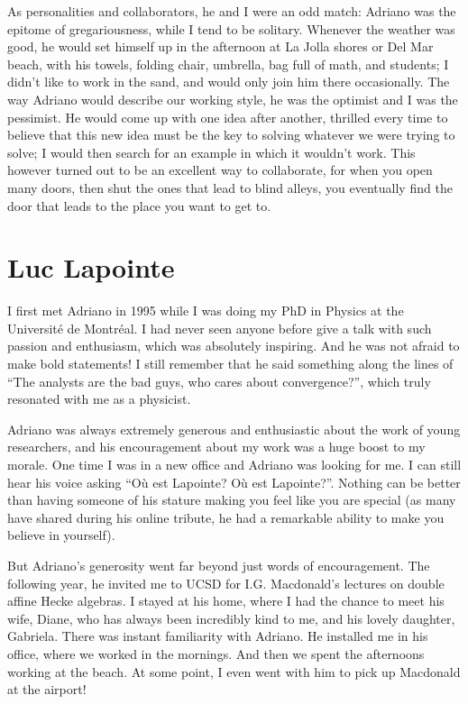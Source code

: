 \documentclass{notices}
\begin{document}
As personalities and collaborators, he and I were an odd match: Adriano was the epitome of gregariousness, while I tend to be solitary.  Whenever the weather was good, he would set himself up in the afternoon at La Jolla shores or Del Mar beach, with his towels, folding chair, umbrella, bag full of math, and students; I didn't like to work in the sand, and would only join him there occasionally.  The way Adriano would describe our working style, he was the optimist and I was the pessimist.  He would come up with one idea after another, thrilled every time to believe that this new idea must be the key to solving whatever we were trying to solve; I would then search for an example in which it wouldn't work.  This however turned out to be an excellent way to collaborate, for when you open many doors, then shut the ones that lead to blind alleys, you eventually find the door that leads to the place you want to get to.

\section*{Luc Lapointe}
I first met Adriano in 1995 while I was doing my PhD in Physics at the Université de Montréal.
I had never seen anyone before give a talk with such passion and enthusiasm, which was absolutely inspiring.
And he was not afraid to make bold statements! I still remember that he said something along the lines of ``The analysts are the bad guys, who cares about convergence?'', which truly resonated with me as a physicist.

Adriano was always extremely generous and enthusiastic about the work of young researchers, and his encouragement about my work was a huge boost to my morale. One time I was in a new office and Adriano was looking for me.  I can still hear his voice asking ``Où est Lapointe? Où est Lapointe?''.  Nothing can be better than having someone of his stature making you feel like you are special  (as many have shared during his online tribute, he had a remarkable ability to make you believe in yourself).

But Adriano's generosity went far beyond just words of encouragement. The following year, he invited me to UCSD for I.G. Macdonald's lectures on double affine Hecke algebras. I stayed at his home, where I had the chance to meet his wife, Diane, who has always been incredibly kind to me, and his lovely daughter, Gabriela.  There was instant familiarity with Adriano.  He installed me in his office, where we worked in the mornings. And then we spent the afternoons working at the beach.  At some point, I even went with him to pick up Macdonald at the airport!  
\end{document}
